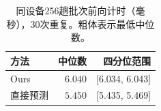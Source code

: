 \begin{table}[t]
\centering\footnotesize\setlength{\tabcolsep}{4pt}
\caption{同设备256趟批次前向计时（毫秒），30次重复。粗体表示最低中位数。}\label{tab:efficiency}
\begin{tabular}{lrr}\toprule
方法 & 中位数 & 四分位范围\\\midrule
Ours & $6.040$ & [6.034, 6.043]\\
直接预测 & $\mathbf{5.450}$ & [5.435, 5.469]\\
\bottomrule\end{tabular}
\end{table}
